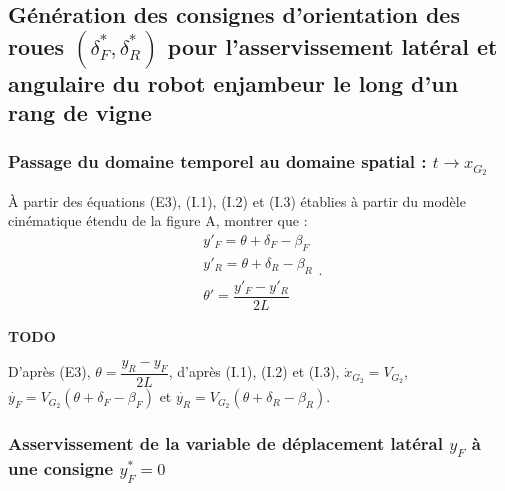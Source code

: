 \documentclass[11pt]{article}
\begin{document}
\subsection{Génération des consignes d’orientation des roues $\left(\delta^*_F,\delta^*_R\right)$ pour l’asservissement latéral et angulaire du robot enjambeur le long d’un rang de vigne}

\subsubsection{Passage du domaine temporel au domaine spatial : $t\to x_{G_2}$}

\UPSTIquestion À partir des équations (E3), (I.1), (I.2) et (I.3) établies à partir du modèle cinématique étendu de la
figure A, montrer que : 
$$ \begin{array}{l}
y'_F = \theta + \delta_F-\beta_F \\
y'_R = \theta + \delta_R-\beta_R \\
\theta'=\dfrac{y'_F-y'_R}{2L}
\end{array}.$$

\begin{UPSTIcorrige}

\textbf{TODO}


D'après (E3), $  \theta = \dfrac{ y_{R} - y_F}{2L } $, d'après  (I.1), (I.2) et (I.3), $\dot{x}_{G_2}=V_{G_2}$, $\dot{y_F}=V_{G_2}\left(\theta + \delta_F - \beta_F\right)$ et  $\dot{y_R}=V_{G_2}\left(\theta + \delta_R - \beta_R\right)$. 

\end{UPSTIcorrige}

\subsubsection{Asservissement de la variable de déplacement latéral $y_F$ à une consigne $y^*_F=0$}

\end{document}
